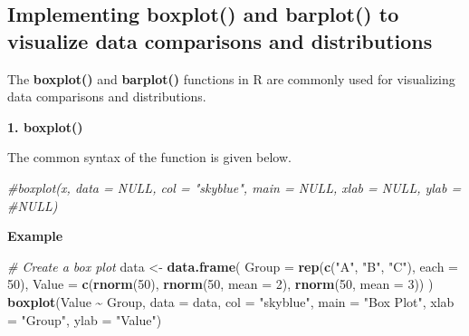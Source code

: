 \documentclass[
]{book}
\newenvironment{Shaded}{\begin{snugshade}}{\end{snugshade}}
\newcommand{\AttributeTok}[1]{\textcolor[rgb]{0.13,0.29,0.53}{#1}}
\newcommand{\CommentTok}[1]{\textcolor[rgb]{0.56,0.35,0.01}{\textit{#1}}}
\newcommand{\DecValTok}[1]{\textcolor[rgb]{0.00,0.00,0.81}{#1}}
\newcommand{\FunctionTok}[1]{\textcolor[rgb]{0.13,0.29,0.53}{\textbf{#1}}}
\newcommand{\NormalTok}[1]{#1}
\newcommand{\OtherTok}[1]{\textcolor[rgb]{0.56,0.35,0.01}{#1}}
\newcommand{\SpecialCharTok}[1]{\textcolor[rgb]{0.81,0.36,0.00}{\textbf{#1}}}
\newcommand{\StringTok}[1]{\textcolor[rgb]{0.31,0.60,0.02}{#1}}
\begin{document}
\subsection{Implementing boxplot() and barplot() to visualize data comparisons and distributions}\label{implementing-boxplot-and-barplot-to-visualize-data-comparisons-and-distributions}

The \textbf{boxplot()} and \textbf{barplot()} functions in R are commonly used for visualizing data comparisons and distributions.

\textbf{1. boxplot()}

The common syntax of the function is given below.

\begin{Shaded}
\begin{Highlighting}[]
\CommentTok{\#boxplot(x, data = NULL, col = "skyblue", main = NULL, xlab = NULL, ylab = \#NULL)}
\end{Highlighting}
\end{Shaded}

\textbf{Example}

\begin{Shaded}
\begin{Highlighting}[]
\CommentTok{\# Create a box plot}
\NormalTok{data }\OtherTok{\textless{}{-}} \FunctionTok{data.frame}\NormalTok{(}
  \AttributeTok{Group =} \FunctionTok{rep}\NormalTok{(}\FunctionTok{c}\NormalTok{(}\StringTok{"A"}\NormalTok{, }\StringTok{"B"}\NormalTok{, }\StringTok{"C"}\NormalTok{), }\AttributeTok{each =} \DecValTok{50}\NormalTok{),}
  \AttributeTok{Value =} \FunctionTok{c}\NormalTok{(}\FunctionTok{rnorm}\NormalTok{(}\DecValTok{50}\NormalTok{), }\FunctionTok{rnorm}\NormalTok{(}\DecValTok{50}\NormalTok{, }\AttributeTok{mean =} \DecValTok{2}\NormalTok{), }\FunctionTok{rnorm}\NormalTok{(}\DecValTok{50}\NormalTok{, }\AttributeTok{mean =} \DecValTok{3}\NormalTok{))}
\NormalTok{)}
\FunctionTok{boxplot}\NormalTok{(Value }\SpecialCharTok{\textasciitilde{}}\NormalTok{ Group, }\AttributeTok{data =}\NormalTok{ data, }\AttributeTok{col =} \StringTok{"skyblue"}\NormalTok{, }\AttributeTok{main =} \StringTok{"Box Plot"}\NormalTok{, }\AttributeTok{xlab =} \StringTok{"Group"}\NormalTok{, }\AttributeTok{ylab =} \StringTok{"Value"}\NormalTok{)}
\end{Highlighting}
\end{Shaded}
\end{document}
